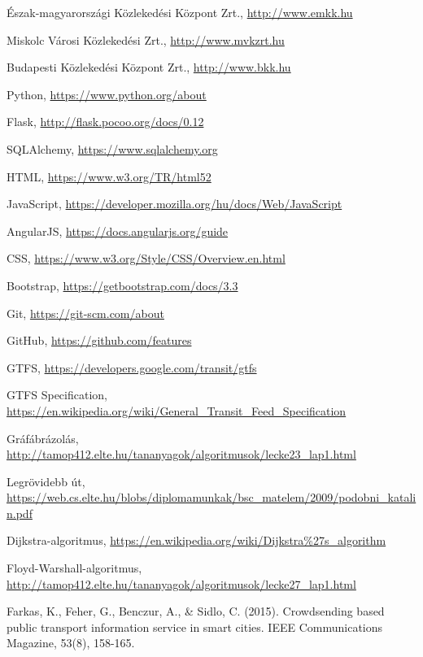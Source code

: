 \begin{thebibliography}{x}

Észak-magyarországi Közlekedési Központ Zrt., \url{http://www.emkk.hu}

Miskolc Városi Közlekedési Zrt., \url{http://www.mvkzrt.hu}

Budapesti Közlekedési Központ Zrt., \url{http://www.bkk.hu}

Python, \url{https://www.python.org/about}

Flask, \url{http://flask.pocoo.org/docs/0.12}

SQLAlchemy, \url{https://www.sqlalchemy.org}

HTML, \url{https://www.w3.org/TR/html52}

JavaScript, \url{https://developer.mozilla.org/hu/docs/Web/JavaScript}

AngularJS, \url{https://docs.angularjs.org/guide}

CSS, \url{https://www.w3.org/Style/CSS/Overview.en.html}

Bootstrap, \url{https://getbootstrap.com/docs/3.3}

Git, \url{https://git-scm.com/about}

GitHub, \url{https://github.com/features}

GTFS, \url{https://developers.google.com/transit/gtfs}

GTFS Specification, \url{https://en.wikipedia.org/wiki/General\_Transit\_Feed\_Specification}

Gráfábrázolás, \url{http://tamop412.elte.hu/tananyagok/algoritmusok/lecke23\_lap1.html}

Legrövidebb út, \url{https://web.cs.elte.hu/blobs/diplomamunkak/bsc\_matelem/2009/podobni\_katalin.pdf}

Dijkstra-algoritmus, \url{https://en.wikipedia.org/wiki/Dijkstra\%27s_algorithm}

Floyd-Warshall-algoritmus, \url{http://tamop412.elte.hu/tananyagok/algoritmusok/lecke27\_lap1.html}

Farkas, K., Feher, G., Benczur, A., \& Sidlo, C. (2015). Crowdsending based public transport information service in smart cities. IEEE Communications Magazine, 53(8), 158-165.

\end{thebibliography}
